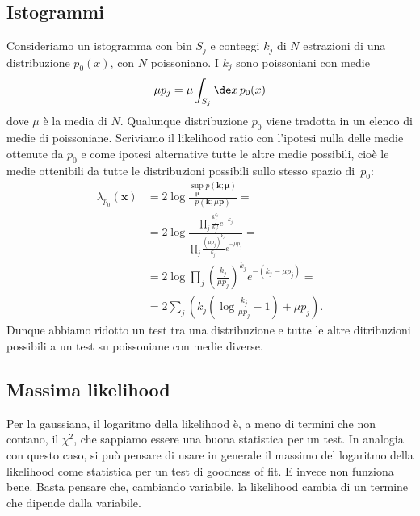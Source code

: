 
\subsection{Istogrammi}

Consideriamo un istogramma con bin $S_j$ e conteggi $k_j$
di $N$ estrazioni di una distribuzione $p_0(x)$,
con $N$ poissoniano.
I $k_j$ sono poissoniani con medie
\begin{equation*}
	\mu p_j = \mu \int_{S_j} \de x\, p_0(x)
\end{equation*}
dove $\mu$ è la media di $N$.
Qualunque distribuzione $p_0$ viene tradotta in un elenco di medie di poissoniane.
Scriviamo il likelihood ratio con l'ipotesi nulla delle medie ottenute da $p_0$
e come ipotesi alternative tutte le altre medie possibili,
cioè le medie ottenibili da tutte le distribuzioni possibili sullo stesso spazio di~$p_0$:
\begin{align*}
	\lambda_{p_0}(\mathbf x)
	&= 2\log \frac
	{\sup\limits_{\boldsymbol\mu} p(\mathbf k;\boldsymbol\mu)}
	{p(\mathbf k;\mu \mathbf p)} = \\
	&= 2\log \frac
	{\prod_j \frac {k_j^{k_j}} {k_j!} e^{-k_j}}
	{\prod_j \frac {(\mu p_j)^{k_j}} {k_j!} e^{-\mu p_j}} = \\
	&= 2\log \prod_j \left(\frac{k_j}{\mu p_j}\right)^{k_j} e^{-(k_j-\mu p_j)} = \\
	&= 2\sum_j \left( k_j\left(\log\frac{k_j}{\mu p_j}-1\right) + \mu p_j \right).
\end{align*}
Dunque abbiamo ridotto un test tra una distribuzione e tutte le altre ditribuzioni possibili
a un test su poissoniane con medie diverse.

\subsection{Massima likelihood}

Per la gaussiana,
il logaritmo della likelihood è, a meno di termini che non contano, il $\chi^2$,
che sappiamo essere una buona statistica per un test.
In analogia con questo caso,
si può pensare di usare in generale il massimo del logaritmo della likelihood
come statistica per un test di goodness of fit.
E invece non funziona bene.
Basta pensare che, cambiando variabile,
la likelihood cambia di un termine che dipende dalla variabile.

